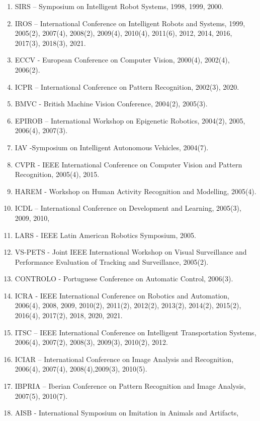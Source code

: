 \begin{enumerate}
\def\labelenumi{\arabic{enumi}.}
\item
  SIRS -- Symposium on Intelligent Robot Systems, 1998, 1999, 2000.
\item
  IROS -- International Conference on Intelligent Robots and Systems,
  1999, 2005(2), 2007(4), 2008(2), 2009(4), 2010(4), 2011(6), 2012,
  2014, 2016, 2017(3), 2018(3), 2021.
\item
  ECCV - European Conference on Computer Vision, 2000(4), 2002(4),
  2006(2).
\item
  ICPR -- International Conference on Pattern Recognition, 2002(3),
  2020.
\item
  BMVC - British Machine Vision Conference, 2004(2), 2005(3).
\item
  EPIROB -- International Workshop on Epigenetic Robotics, 2004(2),
  2005, 2006(4), 2007(3).
\item
  IAV -Symposium on Intelligent Autonomous Vehicles, 2004(7).
\item
  CVPR - IEEE International Conference on Computer Vision and Pattern
  Recognition, 2005(4), 2015.
\item
  HAREM - Workshop on Human Activity Recognition and Modelling, 2005(4).
\item
  ICDL -- International Conference on Development and Learning, 2005(3),
  2009, 2010,
\item
  LARS - IEEE Latin American Robotics Symposium, 2005.
\item
  VS-PETS - Joint IEEE International Workshop on Visual Surveillance and
  Performance Evaluation of Tracking and Surveillance, 2005(2).
\item
  CONTROLO - Portuguese Conference on Automatic Control, 2006(3).
\item
  ICRA - IEEE International Conference on Robotics and Automation,
  2006(4), 2008, 2009, 2010(2), 2011(2), 2012(2), 2013(2), 2014(2),
  2015(2), 2016(4), 2017(2), 2018, 2020, 2021.
\item
  ITSC -- IEEE International Conference on Intelligent Transportation
  Systems, 2006(4), 2007(2), 2008(3), 2009(3), 2010(2), 2012.
\item
  ICIAR -- International Conference on Image Analysis and Recognition,
  2006(4), 2007(4), 2008(4),2009(3), 2010(5).
\item
  IBPRIA -- Iberian Conference on Pattern Recognition and Image
  Analysis, 2007(5), 2010(7).
\item
  AISB - International Symposium on Imitation in Animals and Artifacts,

\end{enumerate}
